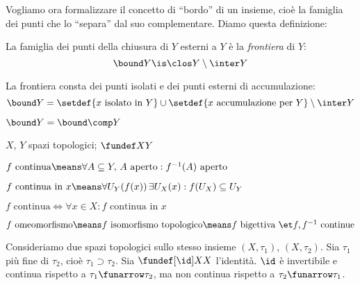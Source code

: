 Vogliamo ora formalizzare il concetto di ``bordo'' di un insieme, cioè la famiglia dei punti che lo ``separa'' dal suo complementare. Diamo questa definizione:

\begin{defn}[Frontiera]
	La famiglia dei punti della chiusura di $Y$ esterni a $Y$ è la \emph{frontiera} di $Y$:
	\[\bound Y\is\clos Y\setminus\inter Y\]
\end{defn}

\begin{prop}
	La frontiera consta dei punti isolati e dei punti esterni di accumulazione:
	\[\bound Y=\setdef{x\text{ isolato in }Y}\cup\setdef{x\text{ accumulazione per }Y}\setminus\inter Y\]
\end{prop}


\begin{prop}
$\bound Y=\bound\comp Y$
\end{prop}


$X$, $Y$ spazi topologici; $\fundef XY$

\begin{defn}[Continuità]
$f\text{ continua}\means\forall A\subseteq Y,\,A\text{ aperto}:f^{-1}(A)\text{ aperto}$
\end{defn}

\begin{defn}
$f\text{ continua in }x\means\forall U_Y(f(x))\,\exists U_X(x):f(U_X)\subseteq U_Y$
\end{defn}

\begin{prop}
$f\text{ continua}\iff\forall x\in X:f\text{ continua in }x$
\end{prop}

\begin{defn}
$f\text{ omeomorfismo}\means f\text{ isomorfismo topologico}\means f\text{ bigettiva }\et f, f^{-1}\text{ continue}$
\end{defn}

\begin{es}
Consideriamo due spazi topologici sullo stesso insieme $(X,\tau_1)$, $(X,\tau_2)$. Sia $\tau_1$ più fine di $\tau_2$, cioè $\tau_1\supset\tau_2$. Sia $\fundef[\id]XX$ l'identità. $\id$ è invertibile e continua rispetto a $\tau_1\funarrow\tau_2$, ma non continua rispetto a $\tau_2\funarrow\tau_1$.
\end{es}

